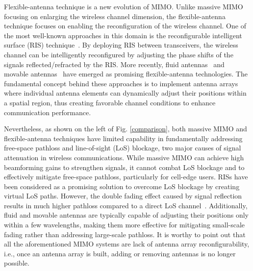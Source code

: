 Flexible-antenna technique is a new evolution of MIMO. Unlike massive MIMO focusing on enlarging the wireless channel dimension, the flexible-antenna technique focuses on enabling the reconfiguration of the wireless channel. One of the most well-known approaches in this domain is the reconfigurable intelligent surface (RIS) technique~\cite{huang2019reconfigurable, wu2019intelligent, mu2021simultaneously}. By deploying RIS between transceivers, the wireless channel can be intelligently reconfigured by adjusting the phase shifts of the signals reflected/refracted by the RIS. More recently, fluid antennas~\cite{new2024tutorial} and movable antennas~\cite{zhu2023movable} have emerged as promising flexible-antenna technologies. The fundamental concept behind these approaches is to implement antenna arrays where individual antenna elements can dynamically adjust their positions within a spatial region, thus creating favorable channel conditions to enhance communication performance. 

Nevertheless, as shown on the left of Fig. \ref{comparison}, both massive MIMO and flexible-antenna techniques have limited capability in fundamentally addressing free-space pathloss and line-of-sight (LoS) blockage, two major causes of signal attenuation in wireless communications. While massive MIMO can achieve high beamforming gains to strengthen signals, it cannot combat LoS blockage and to effectively mitigate free-space pathloss, particularly for cell-edge users. RISs have been considered as a promising solution to overcome LoS blockage by creating virtual LoS paths. However, the double fading effect caused by signal reflection results in much higher pathloss compared to a direct LoS channel~\cite{ozdogan2019intelligent}. Additionally, fluid and movable antennas are typically capable of adjusting their positions only within a few wavelengths, making them more effective for mitigating small-scale fading rather than addressing large-scale pathloss. It is worthy to point out that all the aforementioned MIMO systems are lack of antenna array reconfigurability, i.e., once an antenna array is built, adding or removing antennas is no longer possible.

